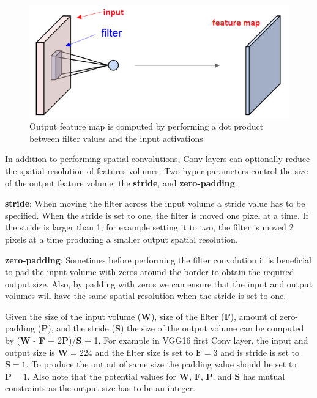 \begin{figure}
  \includegraphics[width=\columnwidth]{./images/cnn_local_computation}
  \caption{Output feature map is computed by performing a dot product between filter values and the input activations}
  \label{fig:conv_local_comp}
\end{figure}

In addition to performing spatial convolutions, Conv layers can optionally reduce the spatial resolution of features volumes. Two hyper-parameters control the size of the output feature volume: the \textbf{stride}, and \textbf{zero-padding}.

\textbf{stride}: When moving the filter across the input volume a stride value has to be specified. When the stride is set to one, the filter is moved one pixel at a time. If the stride is larger than 1, for example setting it to two, the filter is moved 2 pixels at a time producing a smaller output spatial resolution.

\textbf{zero-padding}: Sometimes before performing the filter convolution it is beneficial to pad the input volume with zeros around the border to obtain the required output size. Also, by padding with zeros we can ensure that the input and output volumes will have the same spatial resolution when the stride is set to one.

Given the size of the input volume (\textbf{W}), size of the filter (\textbf{F}), amount of zero-padding (\textbf{P}), and the stride (\textbf{S}) the size of the output volume can be computed by (\textbf{W} - \textbf{F} + 2\textbf{P})/\textbf{S} + 1. For example in VGG16 first Conv layer, the input and output size is $\textbf{W}=224$ and the filter size is set to $\textbf{F}=3$ and is stride is set to $\textbf{S}=1$. To produce the output of same size the padding value should be set to $\textbf{P}=1$. Also note that the potential values for \textbf{W}, \textbf{F}, \textbf{P}, and \textbf{S} has mutual constraints as the output size has to be an integer.


